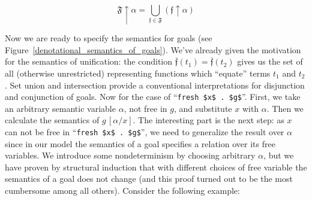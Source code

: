 \[
  \mathfrak{F}\uparrow\alpha = \bigcup_{\mathfrak{f}\in\mathfrak{F}}(\mathfrak{f}\uparrow\alpha)
\]

Now we are ready to specify the semantics for goals (see Figure~\ref{denotational_semantics_of_goals}).
 We've already given the motivation for
  the semantics of unification: the condition $\overline{\mathfrak{f}}(t_1)=\overline{\mathfrak{f}}(t_2)$ gives us the set of all (otherwise
  unrestricted) representing functions which ``equate'' terms $t_1$ and $t_2$.
  Set union and intersection provide a conventional interpretations
for disjunction and conjunction of goals. Now for the case of ``\lstinline|fresh $x$ . $g$|''. First, we take an arbitrary semantic variable $\alpha$,
not free in $g$, and substitute $x$ with $\alpha$. Then we calculate the semantics of $g\,[\alpha/x]$. The interesting part is the next step:
as $x$ can not be free in ``\lstinline|fresh $x$ . $g$|'', we need to generalize the result over $\alpha$ since in our model the semantics of a
goal specifies a relation over its free variables. We introduce some nondeterminism by choosing arbitrary $\alpha$, but we have proven by
structural induction that with different choices of free variable the semantics of a goal does not change (and this proof turned out to
be the most cumbersome among all others). Consider the following example:

